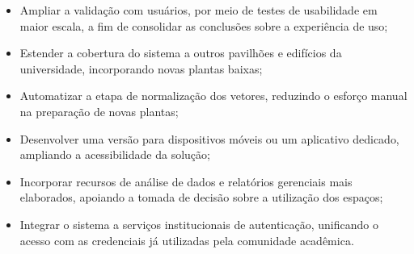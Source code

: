 \begin{itemize}
  \item Ampliar a validação com usuários, por meio de testes de usabilidade em maior escala, a fim de consolidar as conclusões sobre a experiência de uso;
  \item Estender a cobertura do sistema a outros pavilhões e edifícios da universidade, incorporando novas plantas baixas;
  \item Automatizar a etapa de normalização dos vetores, reduzindo o esforço manual na preparação de novas plantas;
  \item Desenvolver uma versão para dispositivos móveis ou um aplicativo dedicado, ampliando a acessibilidade da solução;
  \item Incorporar recursos de análise de dados e relatórios gerenciais mais elaborados, apoiando a tomada de decisão sobre a utilização dos espaços;
  \item Integrar o sistema a serviços institucionais de autenticação, unificando o acesso com as credenciais já utilizadas pela comunidade acadêmica.
\end{itemize}

\pagebreak